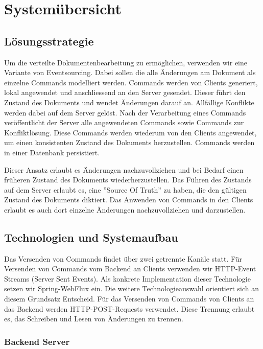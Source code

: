 \section{Systemübersicht}

\subsection{Lösungsstrategie}
Um die verteilte Dokumentenbearbeitung zu ermöglichen, verwenden wir eine Variante von Eventsourcing.
Dabei sollen die alle Änderungen am Dokument als einzelne Commands modelliert werden.
Commands werden von Clients generiert, lokal angewendet und anschliessend an den Server gesendet.
Dieser führt den Zustand des Dokuments und wendet Änderungen darauf an.
Allfällige Konflikte werden dabei auf dem Server gelöst.
Nach der Verarbeitung eines Commands veröffentlicht der Server alle angewendeten Commands sowie Commands zur Konfliktlösung.
Diese Commands werden wiederum von den Clients angewendet, um einen konsistenten Zustand des Dokuments herzustellen.
Commands werden in einer Datenbank persistiert.

Dieser Ansatz erlaubt es Änderungen nachzuvollziehen und bei Bedarf einen früheren Zustand des Dokuments wiederherzustellen.
Das Führen des Zustands auf dem Server erlaubt es, eine ''Source Of Truth'' zu haben, die den gültigen Zustand des Dokuments diktiert.
Das Anwenden von Commands in den Clients erlaubt es auch dort einzelne Änderungen nachzuvollziehen und darzustellen.

\subsection{Technologien und Systemaufbau}

Das Versenden von Commands findet über zwei getrennte Kanäle statt.
Für Versenden von Commands vom Backend an Clients verwenden wir HTTP-Event Streams (Server Sent Events).
Als konkrete Implementation dieser Technologie setzen wir Spring-WebFlux ein.
Die weitere Technologieauswahl orientiert sich an diesem Grundsatz Entscheid.
Für das Versenden von Commands von Clients an das Backend werden HTTP-POST-Requests verwendet.
Diese Trennung erlaubt es, das Schreiben und Lesen von Änderungen zu trennen.

\subsubsection{Backend Server}

